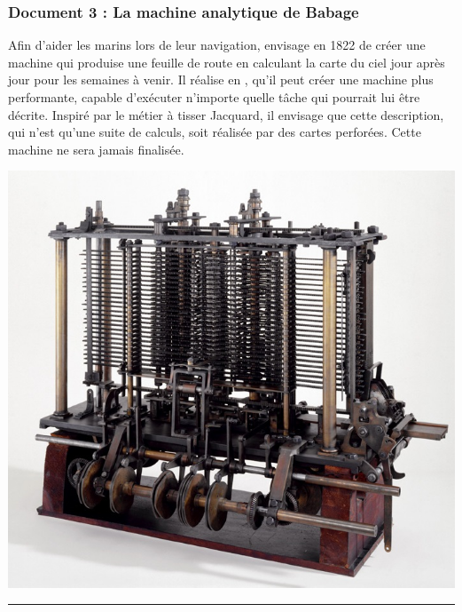\documentclass[a4paper,10pt]{report}
\let\emph\relax
\theoremstyle{exo}
\theoremstyle{exercice}
\begin{document}
\begin{multicols}{2}
\subsubsection{Document 3 : La machine analytique de Babage}
Afin d'aider les marins lors de leur navigation, \emph{Babbage} envisage en 1822 de créer une machine qui produise une feuille de route en calculant la carte du ciel jour après jour pour les semaines à venir. Il réalise en \emph{1834}, qu'il peut créer une machine plus performante, capable d'exécuter n'importe quelle tâche qui pourrait lui être décrite. Inspiré par le métier à tisser Jacquard, il envisage que cette description, qui n'est qu'une suite de calculs, soit réalisée par des cartes perforées. Cette machine ne sera jamais finalisée.
\begin{center}\includegraphics[width=\linewidth]{image/machine-analytique.jpg}\end{center}
\end{multicols}

\noindent\rule{\linewidth}{.25mm}
\end{document}
